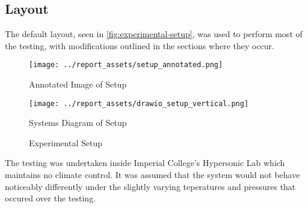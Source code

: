 \subsection{Layout}
The default layout, seen in \autoref{fig:experimental-setup}, was used to perform most of the testing, with modifications outlined in the sections where they occur. 
\begin{figure}[htbp]
    \centering

    \begin{minipage}{0.6\textwidth}
        \centering
        \texttt{[image: ../report\_assets/setup\_annotated.png]}
        \caption*{Annotated Image of Setup}
    \end{minipage}
    \hfill
    \begin{minipage}{0.3\textwidth}
        \centering
        \texttt{[image: ../report\_assets/drawio\_setup\_vertical.png]}
        \caption*{Systems Diagram of Setup}
    \end{minipage}
    \caption{Experimental Setup}\label{fig:experimental-setup}
\end{figure}
The testing was undertaken inside Imperial College's Hypersonic Lab which maintains no climate control. It was assumed that the system would not behave noticeably differently under the slightly varying teperatures and pressures that occured over the testing.


